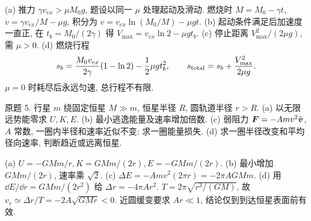 \begin{solution}
(a) 推力 $\gamma v_{ex}>\mu M_0g$, 题设以同一 $\mu$ 处理起动及滑动. 燃烧时 $M=M_0-\gamma t$, $\dot v=\gamma v_{ex}/M-\mu g$, 积分为 $v=v_{ex}\ln(M_0/M)-\mu gt$. (b) 起动条件满足后加速度一直正, 在 $t_b=M_0/(2\gamma)$ 得 $V_{\max}=v_{ex}\ln2-\mu gt_b$. (c) 停止距离 $V_{\max}^2/(2\mu g)$, 需 $\mu>0$. (d) 燃烧行程
\[s_b=\frac{M_0v_{ex}}{2\gamma}(1-\ln2)-\frac12\mu gt_b^2,\qquad s_{\rm total}=s_b+\frac{V_{\max}^2}{2\mu g}.\]
$\mu=0$ 时耗尽后永远匀速, 总行程不有限.
\end{solution}
\begin{exercise}
原题 5. 行星 $m$ 绕固定恒星 $M\gg m$, 恒星半径 $R$, 圆轨道半径 $r>R$. (a) 以无限远势能零求 $U,K,E$. (b) 最小逃逸能量及速率增加倍数. (c) 弱阻力 $\boldsymbol{F}=-Amv^2\hat{\boldsymbol{v}}$, $A$ 常数, 一圈内半径和速率近似不变; 求一圈能量损失. (d) 求一圈半径改变和平均径向速率, 判断趋近或远离恒星.
\end{exercise}
\begin{solution}
(a) $U=-GMm/r,K=GMm/(2r),E=-GMm/(2r)$. (b) 最小增加 $GMm/(2r)$, 速率乘 $\sqrt2$. (c) $\Delta E=-Amv^2(2\pi r)=-2\pi A GMm$. (d) 用 $\dd E/\dd r=GMm/(2r^2)$ 给 $\Delta r=-4\pi Ar^2$. $T=2\pi\sqrt{r^3/(GM)}$, 故 $v_r\simeq\Delta r/T=-2A\sqrt{GMr}<0$. 近圆缓变要求 $Ar\ll1$, 结论仅到到达恒星表面前有效.
\end{solution}

